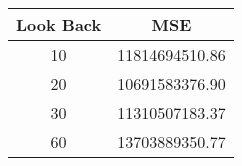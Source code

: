 \begin{tabular}{cc}
    \toprule
    Look Back & MSE \\
    \midrule
    10 & 11814694510.86 \\
    20 & 10691583376.90 \\
    30 & 11310507183.37 \\
    60 & 13703889350.77 \\
    \bottomrule
\end{tabular}
